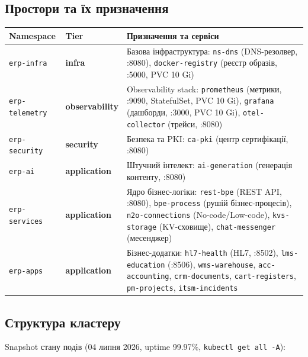 \documentclass[12pt,a4paper]{article}
\begin{document}
\newpage
\subsection{Простори та їх призначення}

\begin{longtable}{L{3cm} L{2.3cm} L{8.7cm}}
\toprule
{}
\color{primary}\textbf{Namespace} &
\color{primary}\textbf{Tier} &
\color{primary}\textbf{Призначення та сервіси} \\
\midrule\endhead\bottomrule\endfoot
\texttt{erp-infra}
  & \textcolor{infrablue}{\textbf{infra}}
  & Базова інфраструктура: \texttt{ns-dns} (DNS-резолвер, :8080),
    \texttt{docker-registry} (реєстр образів, :5000, PVC 10 Gi) \\[4pt]
\texttt{erp-telemetry}
  & \textcolor{successgreen}{\textbf{observability}}
  & Observability stack: \texttt{prometheus} (метрики, :9090, StatefulSet, PVC 10 Gi),
    \texttt{grafana} (дашборди, :3000, PVC 10 Gi),
    \texttt{otel-collector} (трейси, :8080) \\[4pt]
\texttt{erp-security}
  & \textcolor{secpurple}{\textbf{security}}
  & Безпека та PKI: \texttt{ca-pki} (центр сертифікації, :8080) \\[4pt]
\texttt{erp-ai}
  & \textcolor{tieryellow}{\textbf{application}}
  & Штучний інтелект: \texttt{ai-generation} (генерація контенту, :8080) \\[4pt]
\texttt{erp-services}
  & \textcolor{tieryellow}{\textbf{application}}
  & Ядро бізнес-логіки: \texttt{rest-bpe} (REST API, :8080),
    \texttt{bpe-process} (рушій бізнес-процесів),
    \texttt{n2o-connections} (No-code/Low-code),
    \texttt{kvs-storage} (KV-сховище),
    \texttt{chat-messenger} (месенджер) \\[4pt]
\texttt{erp-apps}
  & \textcolor{tieryellow}{\textbf{application}}
  & Бізнес-додатки: \texttt{hl7-health} (HL7, :8502),
    \texttt{lms-education} (:8506),
    \texttt{wms-warehouse},
    \texttt{acc-accounting},
    \texttt{crm-documents},
    \texttt{cart-registers},
    \texttt{pm-projects},
    \texttt{itsm-incidents} \\[4pt]
\end{longtable}

\newpage
\subsection{Структура кластеру}

Snapshot стану подів (04 липня 2026, uptime 99.97\%, \texttt{kubectl get all -A}):
\end{document}
